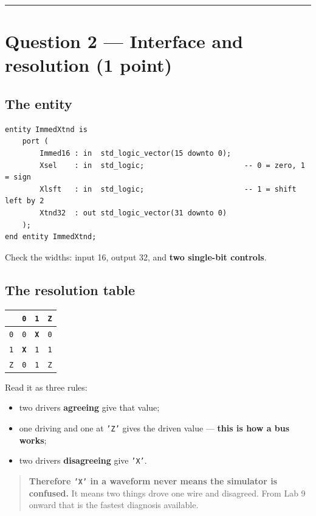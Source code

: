 \documentclass[11pt]{article}
\newcommand{\code}[1]{\texttt{#1}}
\newcommand{\hr}{\vspace{2pt}\hrule\vspace{6pt}}
\begin{document}
\vspace{4pt}\hr

\section*{Question 2 --- Interface and resolution (1 point)}

\subsection*{The entity}

\begin{lstlisting}
entity ImmedXtnd is
    port (
        Immed16 : in  std_logic_vector(15 downto 0);
        Xsel    : in  std_logic;                       -- 0 = zero, 1 = sign
        Xlsft   : in  std_logic;                       -- 1 = shift left by 2
        Xtnd32  : out std_logic_vector(31 downto 0)
    );
end entity ImmedXtnd;
\end{lstlisting}

Check the widths: input 16, output 32, and \textbf{two single-bit controls}.

\subsection*{The resolution table}

\begin{center}
\begin{tabular}{c||ccc}
\toprule
& \code{0} & \code{1} & \code{Z} \\
\midrule
\code{0} & \code{0} & \textbf{\code{X}} & \code{0} \\
\code{1} & \textbf{\code{X}} & \code{1} & \code{1} \\
\code{Z} & \code{0} & \code{1} & \code{Z} \\
\bottomrule
\end{tabular}
\end{center}

Read it as three rules:
\begin{itemize}[leftmargin=1.6em,itemsep=1pt]
\item two drivers \textbf{agreeing} give that value;
\item one driving and one at \code{'Z'} gives the driven value --- \textbf{this is
how a bus works};
\item two drivers \textbf{disagreeing} give \code{'X'}.
\end{itemize}

\begin{quote}
\textbf{Therefore \code{'X'} in a waveform never means the simulator is confused.}
It means two things drove one wire and disagreed. From Lab 9 onward that is the
fastest diagnosis available.
\end{quote}
\end{document}
